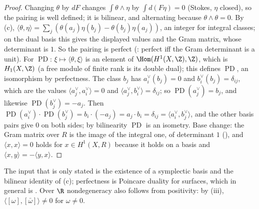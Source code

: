 \begin{proof}
Changing $\theta$ by $dF$ changes $\int\theta\wedge\eta$ by $\int d(F\eta)=0$ (Stokes, $\eta$ closed), so the pairing is well defined; it is bilinear, and alternating because
$\theta\wedge\theta=0$. By (c),
$\langle\theta,\eta\rangle=\sum_j(\theta(a_j)\eta(b_j)-\theta(b_j)\eta(a_j))$, an integer for integral classes; on the dual basis this gives the displayed values and the Gram matrix,
whose determinant is $1$. So the pairing is perfect (: perfect iff the Gram determinant is a unit). For $\operatorname{PD}$: $\xi\mapsto\langle\theta,\xi\rangle$ is an
element of $\Hom(H^1(X,\Z),\Z)$, which is $H_1(X,\Z)$ (a free module of finite rank is its double dual); this defines $\operatorname{PD}$, an isomorphism by perfectness. The class
$b_j$ has $a_i^\vee(b_j)=0$ and $b_i^\vee(b_j)=\delta_{ij}$, which are the values $\langle a_j^\vee,a_i^\vee\rangle=0$ and $\langle a_j^\vee,b_i^\vee\rangle=\delta_{ij}$; so $\operatorname{PD}(a_j^\vee)=b_j$, and
likewise $\operatorname{PD}(b_j^\vee)=-a_j$. Then $\operatorname{PD}(a_i^\vee)\cdot\operatorname{PD}(b_j^\vee)=b_i\cdot(-a_j)=a_j\cdot b_i=\delta_{ij}=\langle a_i^\vee,b_j^\vee\rangle$, and the other basis pairs give $0$ on both
sides; by bilinearity $\operatorname{PD}$ is an isometry. Base change: the Gram matrix over $R$ is the image of the integral one, of determinant $1$ (), and
$\langle x,x\rangle=0$ holds for $x\in H^1(X,R)$ because it holds on a basis and $\langle x,y\rangle=-\langle y,x\rangle$.
\end{proof}

The input that is only stated is the existence of a symplectic basis and the bilinear identity of (c); perfectness is Poincare duality for
surfaces, which in general is \cite[Section 3.3]{Hatcher02}. Over $\R$ nondegeneracy also follows from positivity: by (iii), $\langle[\omega],[\bar\omega]\rangle\ne0$
for $\omega\ne0$.

